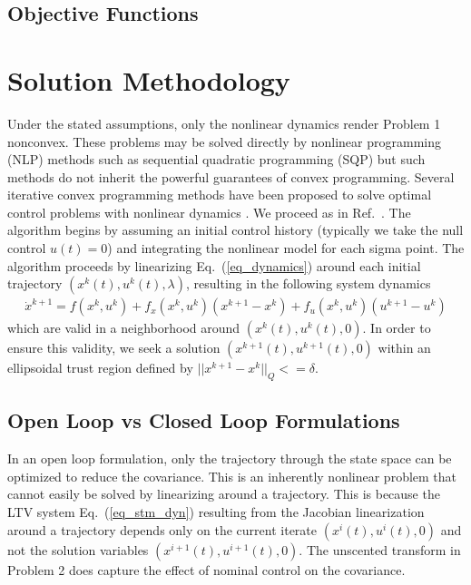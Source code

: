 \documentclass[10pt,a4paper]{article}
\begin{document}
		
	
	\subsection{Objective Functions}
	
	\section{Solution Methodology}
	Under the stated assumptions, only the nonlinear dynamics render Problem 1 nonconvex. These problems may be solved directly by nonlinear programming (NLP) methods such as sequential quadratic programming (SQP) but such methods do not inherit the powerful guarantees of convex programming.
	Several iterative convex programming methods have been proposed to solve optimal control problems with nonlinear dynamics \cite{SeqConProg,SuccConvex1}. We proceed as in Ref.~\cite{SuccConvex1}. The algorithm begins by assuming an initial control history (typically we take the null control $u(t)=0$) and integrating the nonlinear model for each sigma point. The algorithm proceeds by linearizing Eq.~(\ref{eq_dynamics}) around each initial trajectory $ (x^k(t),u^k(t),\lambda) $, resulting in the following system dynamics
	\begin{align}
	\dot{x}^{k+1} = f(x^{k},u^k) + f_x(x^k,u^k)(x^{k+1}-x^k) + f_u(x^k,u^k)(u^{k+1}-u^k) \label{eq_linearized}
	\end{align}
	which are valid in a neighborhood around $ (x^k(t),u^k(t),0) $. In order to ensure this validity, we seek a solution $ (x^{k+1}(t),u^{k+1}(t),0) $ within an ellipsoidal trust region defined by $||x^{k+1}-x^k||_Q <= \delta$.
	
	
	\subsection{Open Loop vs Closed Loop Formulations}
	In an open loop formulation, only the trajectory through the state space can be optimized to reduce the covariance. This is an inherently nonlinear problem that cannot easily be solved by linearizing around a trajectory. This is because the LTV system Eq.~(\ref{eq_stm_dyn}) resulting from the Jacobian linearization around a trajectory depends only on the current iterate $ (x^i(t),u^i(t),0) $ and not the solution variables $ (x^{i+1}(t),u^{i+1}(t),0) $. The unscented transform in Problem 2 does capture the effect of nominal control on the covariance. 
	
\end{document}
